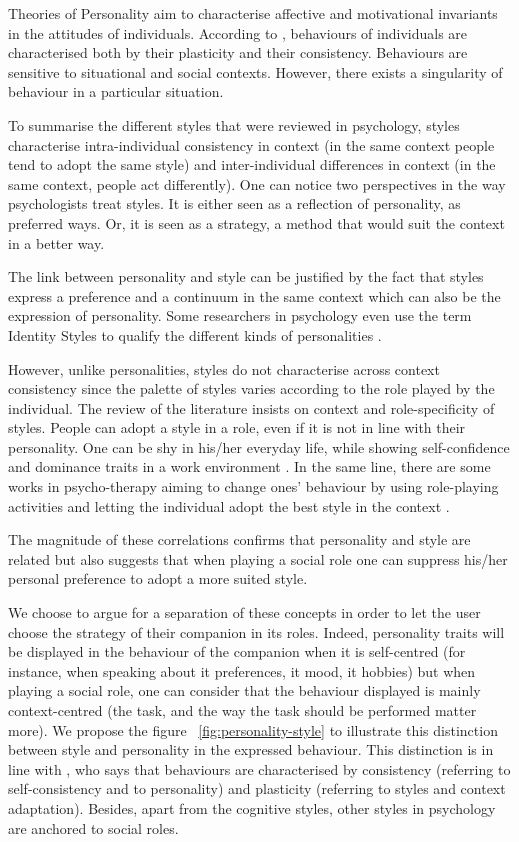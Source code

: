 \documentclass[a4paper,twocolumn]{svjour3}
\begin{document}
Theories of Personality aim to characterise affective and motivational invariants in the attitudes of individuals.
According to \cite{Huteau}, behaviours of individuals are characterised both by their plasticity and their consistency.
Behaviours are sensitive to situational and social contexts. 
However, there exists a singularity of behaviour in a particular situation.

To summarise the different styles that were reviewed in psychology, styles characterise intra-individual consistency in context (in the same context people tend to adopt the same style) and inter-individual differences in context (in the same context, people act differently). 
One can notice two perspectives in the way psychologists treat styles. 
It is either seen as a reflection of personality, as preferred ways. 
Or, it is seen as a strategy, a method that would suit the context in a better way. 

The link between personality and style \cite{Sternberg1997,Hayes} can be justified by the fact that styles express a preference and a continuum in the same context which can also be the expression of personality.
Some researchers in psychology even use the term Identity Styles to qualify the different kinds of personalities \cite{Berzonsky2011}.

However, unlike personalities, styles do not characterise across context consistency since the palette of styles varies according to the role played by the individual.
The review of the literature insists on context and role-specificity of styles. 
People can adopt a style in a role, even if it is not in line with their personality. 
One can be shy in his/her everyday life, while showing  self-confidence and dominance traits in a work environment .
In the same line, there are some works in psycho-therapy aiming to change ones' behaviour by using role-playing activities and letting the individual adopt the best style in the context \cite{Mehrabian1971}. 

The magnitude of these correlations confirms that personality and style are related but also suggests that when playing a social role one can suppress his/her personal preference to adopt a more suited style. 

We choose to argue for a separation of these concepts in order to let the user choose the strategy of their companion in its roles. 
Indeed, personality traits will be displayed in the behaviour of the companion when it is self-centred (for instance, when speaking about it preferences, it mood, it hobbies) but when playing a social role, one can consider that the behaviour displayed is mainly context-centred (the task, and the way the task should be performed matter more). 
We propose the figure ~\ref{fig:personality-style} to illustrate this distinction between style and personality in the expressed behaviour. 
This distinction is in line with \cite{Huteau}, who says that behaviours are characterised by consistency (referring to self-consistency and to personality) and plasticity (referring to styles and context adaptation).
Besides, apart from the cognitive styles, other styles in psychology are anchored to social roles.
\end{document}
